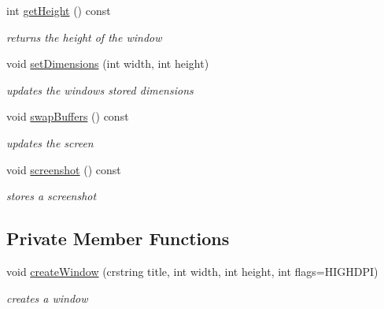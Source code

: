 \begin{DoxyCompactItemize}
\mbox{\label{classnta_1_1Window_a0daae9b6ad0a0ea834f90e86a9416f88}} 
int \hyperlink{classnta_1_1Window_a0daae9b6ad0a0ea834f90e86a9416f88}{get\+Height} () const
\begin{DoxyCompactList}\small\item\em returns the height of the window \end{DoxyCompactList}\item 
\mbox{\label{classnta_1_1Window_a3dd8aab88817189b409643d75e476597}} 
void \hyperlink{classnta_1_1Window_a3dd8aab88817189b409643d75e476597}{set\+Dimensions} (int width, int height)
\begin{DoxyCompactList}\small\item\em updates the window\textquotesingle{}s stored dimensions \end{DoxyCompactList}\item 
\mbox{\label{classnta_1_1Window_a5fdc643079410c14855a260ace84478e}} 
void \hyperlink{classnta_1_1Window_a5fdc643079410c14855a260ace84478e}{swap\+Buffers} () const
\begin{DoxyCompactList}\small\item\em updates the screen \end{DoxyCompactList}\item 
void \hyperlink{classnta_1_1Window_aa144f6bb014aaad3c91c3f3e6ad56f9c}{screenshot} () const
\begin{DoxyCompactList}\small\item\em stores a screenshot \end{DoxyCompactList}\end{DoxyCompactItemize}
\subsection*{Private Member Functions}
\begin{DoxyCompactItemize}
\item 
\mbox{\label{classnta_1_1Window_a060538d57e5099e4cc89f7c892bbf0db}} 
void \hyperlink{classnta_1_1Window_a060538d57e5099e4cc89f7c892bbf0db}{create\+Window} (crstring title, int width, int height, int flags=H\+I\+G\+H\+D\+PI)
\begin{DoxyCompactList}\small\item\em creates a window \end{DoxyCompactList}\end{DoxyCompactItemize}
